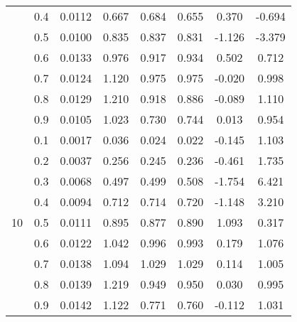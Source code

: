 \documentclass[11pt,a4paper]{report}
\begin{document}
\begin{longtable}{ | c | c || c | c | c | c | c | c | }
 & 0.4 & 0.0112 & 0.667 & 0.684 & 0.655 & 0.370 & -0.694 \\
 & 0.5 & 0.0100 & 0.835 & 0.837 & 0.831 & -1.126 & -3.379 \\
 & 0.6 & 0.0133 & 0.976 & 0.917 & 0.934 & 0.502 & 0.712 \\
 & 0.7 & 0.0124 & 1.120 & 0.975 & 0.975 & -0.020 & 0.998 \\
 & 0.8 & 0.0129 & 1.210 & 0.918 & 0.886 & -0.089 & 1.110 \\
 & 0.9 & 0.0105 & 1.023 & 0.730 & 0.744 & 0.013 & 0.954 \\
 \hline
\multirow{9}{*}{10} & 0.1 & 0.0017 & 0.036 & 0.024 & 0.022 & -0.145 & 1.103 \\
 & 0.2 & 0.0037 & 0.256 & 0.245 & 0.236 & -0.461 & 1.735 \\
 & 0.3 & 0.0068 & 0.497 & 0.499 & 0.508 & -1.754 & 6.421 \\
 & 0.4 & 0.0094 & 0.712 & 0.714 & 0.720 & -1.148 & 3.210 \\
 & 0.5 & 0.0111 & 0.895 & 0.877 & 0.890 & 1.093 & 0.317 \\
 & 0.6 & 0.0122 & 1.042 & 0.996 & 0.993 & 0.179 & 1.076 \\
 & 0.7 & 0.0138 & 1.094 & 1.029 & 1.029 & 0.114 & 1.005 \\
 & 0.8 & 0.0139 & 1.219 & 0.949 & 0.950 & 0.030 & 0.995 \\
 & 0.9 & 0.0142 & 1.122 & 0.771 & 0.760 & -0.112 & 1.031 \\
 \hline
\hline
\end{longtable}
\end{document}
